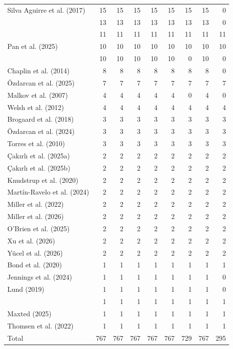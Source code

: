 \begin{table}[H]
\begin{tabular}{lrrrrrrrr}
Silva Aguirre et al. (2017) & 15 & 15 & 15 & 15 & 15 & 15 & 15 & 0\\
\citet{Soubiran2024} & 13 & 13 & 13 & 13 & 13 & 13 & 13 & 0\\
\citet{Helminiak2019} & 11 & 11 & 11 & 11 & 11 & 11 & 11 & 11\\
Pan et al. (2025) & 10 & 10 & 10 & 10 & 10 & 10 & 10 & 10\\
\citet{ligi2016} & 10 & 10 & 10 & 10 & 10 & 0 & 10 & 0\\
Chaplin et al. (2014) & 8 & 8 & 8 & 8 & 8 & 8 & 8 & 0\\
{\"O}zdarcan et al. (2025) & 7 & 7 & 7 & 7 & 7 & 7 & 7 & 7\\
Malkov et al. (2007) & 4 & 4 & 4 & 4 & 4 & 0 & 4 & 0\\
Welsh et al. (2012) & 4 & 4 & 4 & 4 & 4 & 4 & 4 & 4\\
Brogaard et al. (2018) & 3 & 3 & 3 & 3 & 3 & 3 & 3 & 3\\
{\"O}zdarcan et al. (2024) & 3 & 3 & 3 & 3 & 3 & 3 & 3 & 3\\
Torres et al. (2010) & 3 & 3 & 3 & 3 & 3 & 3 & 3 & 3\\
{\c C}ak{\i}rl{\i} et al. (2025a) & 2 & 2 & 2 & 2 & 2 & 2 & 2 & 2\\
{\c C}ak{\i}rl{\i} et al. (2025b) & 2 & 2 & 2 & 2 & 2 & 2 & 2 & 2\\
Knudstrup et al. (2020) & 2 & 2 & 2 & 2 & 2 & 2 & 2 & 2\\
Mart{\'i}n-Ravelo et al. (2024) & 2 & 2 & 2 & 2 & 2 & 2 & 2 & 2\\
Miller et al. (2022) & 2 & 2 & 2 & 2 & 2 & 2 & 2 & 2\\
Miller et al. (2026) & 2 & 2 & 2 & 2 & 2 & 2 & 2 & 2\\
O'Brien et al. (2025) & 2 & 2 & 2 & 2 & 2 & 2 & 2 & 2\\
Xu et al. (2026) & 2 & 2 & 2 & 2 & 2 & 2 & 2 & 2\\
Y{\"u}cel et al. (2026) & 2 & 2 & 2 & 2 & 2 & 2 & 2 & 2\\
Bond et al. (2020) & 1 & 1 & 1 & 1 & 1 & 1 & 1 & 1\\
Jennings et al. (2024) & 1 & 1 & 1 & 1 & 1 & 1 & 1 & 0\\
Lund (2019) & 1 & 1 & 1 & 1 & 1 & 1 & 1 & 0\\
\citet{maxted2023benchmark} & 1 & 1 & 1 & 1 & 1 & 1 & 1 & 1\\
Maxted (2025) & 1 & 1 & 1 & 1 & 1 & 1 & 1 & 1\\
Thomsen et al. (2022) & 1 & 1 & 1 & 1 & 1 & 1 & 1 & 1\\
Total & 767 & 767 & 767 & 767 & 767 & 729 & 767 & 295\\
\hline
\end{tabular}
\label{MS_catalog_database_D}
\end{table}

